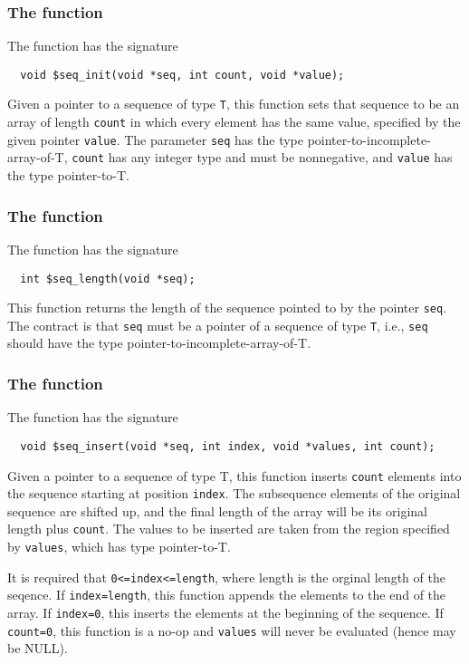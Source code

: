 \subsubsection{The \cseqinit{} function}

The \cseqinit{} function has the signature
\begin{verbatim}
  void $seq_init(void *seq, int count, void *value);
\end{verbatim}

Given a pointer to a sequence of type \texttt{T}, this function sets that sequence to be an array of length \texttt{count} in which every element has the same value, specified by the given pointer \texttt{value}. The parameter \texttt{seq} has the type pointer-to-incomplete-array-of-T, \texttt{count} has any integer type and must be nonnegative, and \texttt{value} has the type pointer-to-T.

\subsubsection{The \cseqlen{} function}
The \cseqlen{} function has the signature
\begin{verbatim}
  int $seq_length(void *seq);
\end{verbatim}
This function returns the length of the sequence pointed to by the pointer \texttt{seq}. The contract is that \texttt{seq} must be a pointer of a sequence of type \texttt{T}, i.e., \texttt{seq} should have the type pointer-to-incomplete-array-of-T.

\subsubsection{The \cseqinsert{} function}
The \cseqinsert{} function has the signature
\begin{verbatim}
  void $seq_insert(void *seq, int index, void *values, int count);
\end{verbatim}

Given a pointer to a sequence of type T, this function inserts \texttt{count} elements into the sequence starting at position
 \texttt{index}. The subsequence elements of the original sequence are shifted up, and the final length of the array will be its original length
plus \texttt{count}. The values to be inserted are taken from the region specified by \texttt{values}, which has type pointer-to-T.  

It is required that \texttt{0<=index<=length}, where length is the orginal length of the seqence. If \texttt{index=length}, this function appends the elements to the end of the array. If \texttt{index=0}, this inserts the elements at the beginning of the sequence.  If \texttt{count=0}, this function is a no-op and \texttt{values} will never be evaluated (hence may be NULL).

